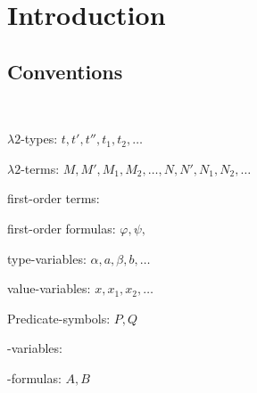 \section{Introduction}

\subsection{Conventions}
~

$\lambda2$-types: $t, t', t'', t_1, t_2, \dots$

$\lambda2$-terms: $M, M', M_1, M_2,\dots, N, N', N_1, N_2, \dots$

first-order terms: 

first-order formulas: $\varphi,\psi,$

type-variables: $\alpha, a, \beta, b, \dots$

value-variables: $x, x_1 , x_2 ,\dots$

Predicate-symbols: $P,Q$

\SysP-variables:

\SysP-formulas: $A, B$

